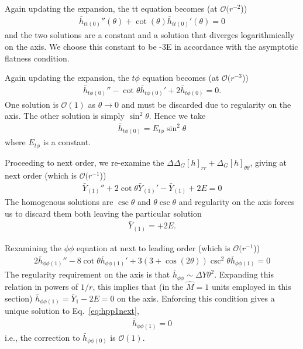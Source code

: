 \documentclass[aps,prd,amsmath,showpacs,amssymb,superscriptaddress,nofootinbib,longbibliography,eqsecnum,preprintnumbers]{revtex4-1}
\begin{document}
Again updating the expansion, the tt equation becomes  (at  $\mathcal{O}(r^{-2}$))
\begin{align}
\bar h_{tt(0)}''(\theta )+\cot (\theta ) \bar h_{tt(0)}'(\theta )=0
\end{align}
and the two solutions are a constant and a solution that diverges logarithmically on the axis. We choose this constant to be -3E in accordance with the asymptotic flatness condition.

Again updating the expansion, the $t\phi$ equation becomes  (at  $\mathcal{O}(r^{-3}$))
\begin{align}
\bar h_{t\phi(0)}''-\cot\theta\bar h_{t\phi(0)}'+2\bar h_{t\phi(0)}=0.
\end{align}
One solution is $\mathcal{O}(1)$ as $\theta \to 0$ and must be discarded due to regularity on the axis. The other solution is simply $\sin^2\theta$. Hence we take
\begin{align}
\bar h_{t\phi(0)}=E_{t\phi}\sin^2\theta
\end{align}
where $E_{t\phi}$ is a constant.

Proceeding to next order, we re-examine the  $\Delta  \Delta_G[h]_{rr}+ \Delta_G[h]_{\theta\theta}$, giving at next order (which is $\mathcal{O}(r^{-1}$))
\begin{align}
\bar Y_{(1)}''+2\cot\theta\bar Y_{(1)}'-\bar Y_{(1)}+2E=0
\end{align}
The homogenous solutions are $\csc\theta$ and $\theta \csc\theta$ and regularity on the axis forces us to discard them both leaving the particular solution
\begin{align}
\bar Y_{(1)}=+2E.
\end{align}

Rexamining the $\phi\phi$ equation at next to leading order (which is $\mathcal{O}(r^{-1}$))
\begin{align}
2\bar h_{\phi\phi(1)}''-8\cot\theta \bar h_{\phi\phi(1)}'+3(3+\cos(2\theta))\csc^2\theta \bar h_{\phi\phi(1)} =0 
\label{eq:hpp1next}
\end{align}
The regularity requirement on the axis is that $\bar h_{\phi\phi}\sim \Delta Y \theta^2$. Expanding this relation in powers of $1/r$, this implies that (in the $\hat M =1$ units employed in this section) $\bar h_{\phi\phi(1)}=\bar Y_{1}-2E =0$ on the axis. Enforcing this condition gives a unique solution to Eq.~\eqref{eq:hpp1next},
\begin{align}
\bar h_{\phi\phi(1)}=0
\end{align}
i.e., the correction to $\bar h_{\phi\phi(0)}$ is $\mathcal{O}(1)$.
\end{document}
